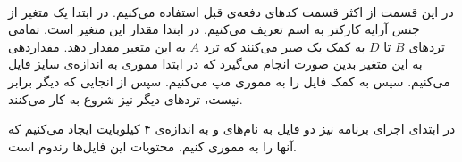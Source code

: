 \\\noindent
در این قسمت از اکثر قسمت کد‌های دفعه‌ی قبل استفاده می‌کنیم. در ابتدا یک متغیر
از جنس آرایه کارکتر به اسم
تعریف می‌کنیم. در ابتدا مقدار این متغیر
است. تمامی ترد‌های
$B$ تا $D$
به کمک یک
صبر می‌کنند که ترد
$A$
به این متغیر مقدار دهد.
مقداردهی به این متغیر بدین صورت انجام می‌گیرد که در ابتدا مموری
به اندازه‌ی سایز فایل
می‌کنیم. سپس به کمک
فایل را به مموری مپ می‌کنیم.
سپس از انجایی که دیگر
برابر
نیست، ترد‌های دیگر نیز شروع به کار می‌کنند.

در ابتدای اجرای برنامه نیز دو فایل به نام‌های
 و 
به اندازه‌ی ۴ کیلوبایت ایجاد می‌کنیم که آنها را به مموری
کنیم. محتویات این فایل‌ها رندوم است.

